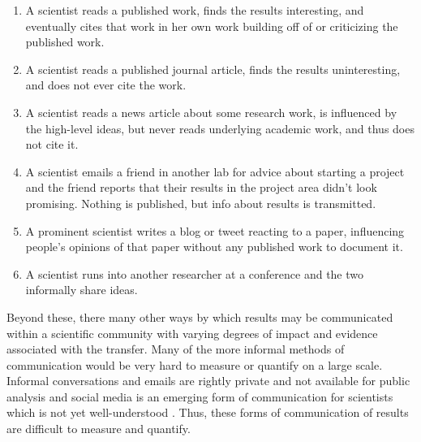 \begin{enumerate}
\def\labelenumi{\arabic{enumi}.}
\tightlist
\item
  A scientist reads a published work, finds the results interesting, and
  eventually cites that work in her own work building off of or
  criticizing the published work.
\item
  A scientist reads a published journal article, finds the results
  uninteresting, and does not ever cite the work.
\item
  A scientist reads a news article about some research work, is
  influenced by the high-level ideas, but never reads underlying
  academic work, and thus does not cite it.
\item
  A scientist emails a friend in another lab for advice about starting a
  project and the friend reports that their results in the project area
  didn't look promising. Nothing is published, but info about results is
  transmitted.
\item
  A prominent scientist writes a blog or tweet reacting to a paper,
  influencing people's opinions of that paper without any published work
  to document it.
\item
  A scientist runs into another researcher at a conference and the two
  informally share ideas.
\end{enumerate}

Beyond these, there many other ways by which results may be communicated
within a scientific community with varying degrees of impact and
evidence associated with the transfer. Many of the more informal methods
of communication would be very hard to measure or quantify on a large
scale. Informal conversations and emails are rightly private and not
available for public analysis and social media is an emerging form of
communication for scientists which is not yet well-understood
\autocite{collinsHowAreScientists2016a}. Thus, these forms of
communication of results are difficult to measure and quantify.

